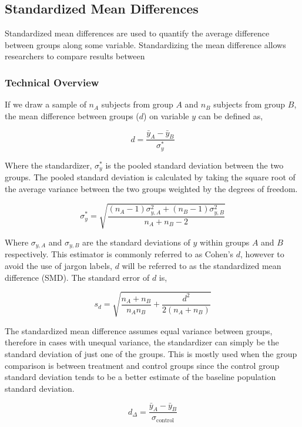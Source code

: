 \documentclass[
  letterpaper,
  DIV=11,
  numbers=noendperiod]{scrreprt}
\begin{document}
\hypertarget{standardized-mean-differences}{%
\subsection{Standardized Mean
Differences}\label{standardized-mean-differences}}

Standardized mean differences are used to quantify the average
difference between groups along some variable. Standardizing the mean
difference allows researchers to compare results between

\hypertarget{technical-overview-1}{%
\subsubsection*{Technical Overview}\label{technical-overview-1}}

If we draw a sample of \(n_A\) subjects from group \(A\) and \(n_B\)
subjects from group \(B\), the mean difference between groups (\(d\)) on
variable \(y\) can be defined as,

\[
d=\frac{\bar{y}_A - \bar{y}_B}{\sigma_y^{*}}
\]

Where the standardizer, \(\sigma_y^*\) is the pooled standard deviation
between the two groups. The pooled standard deviation is calculated by
taking the square root of the average variance between the two groups
weighted by the degrees of freedom.

\[
\sigma_y^*=\sqrt{\frac{(n_A-1)\sigma^2_{y,A} + (n_B-1)\sigma^2_{y,B}}{n_A + n_B - 2}}
\]

Where \(\sigma_{y,A}\) and \(\sigma_{y,B}\) are the standard deviations
of \(y\) within groups \(A\) and \(B\) respectively. This estimator is
commonly referred to as Cohen's \(d\), however to avoid the use of
jargon labels, \(d\) will be referred to as the standardized mean
difference (SMD). The standard error of \(d\) is,

\[
s_d = \sqrt{ \frac{n_A + n_B}{n_An_B} + \frac{d^2}{2(n_A+n_B)}}
\]

The standardized mean difference assumes equal variance between groups,
therefore in cases with unequal variance, the standardizer can simply be
the standard deviation of just one of the groups. This is mostly used
when the group comparison is between treatment and control groups since
the control group standard deviation tends to be a better estimate of
the baseline population standard deviation.

\[
d_{\Delta}=\frac{\bar{y}_A-\bar{y}_B}{\sigma_{\text{control}}}
\]
\end{document}
